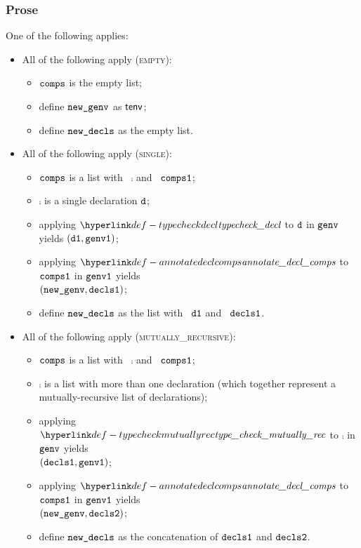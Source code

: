 \subsubsection{Prose}
One of the following applies:
\begin{itemize}
  \item All of the following apply (\textsc{empty}):
  \begin{itemize}
    \item $\texttt{comps}$ is the empty list;
    \item define $\texttt{new\_genv}$ as $\textsf{tenv}$;
    \item define $\texttt{new\_decls}$ as the empty list.
  \end{itemize}

  \item All of the following apply (\textsc{single}):
  \begin{itemize}
    \item $\texttt{comps}$ is a list with \head\ $\comp$ and \tail\ $\texttt{comps1}$;
    \item $\comp$ is a single declaration $\texttt{d}$;
    \item applying $\typecheckdecl$ to $\texttt{d}$ in $\texttt{genv}$ yields $(\texttt{d1}, \texttt{genv1})$\ProseOrTypeError;
    \item applying $\annotatedeclcomps$ to $\texttt{comps1}$ in $\texttt{genv1}$ yields \\ $(\texttt{new\_genv}, \texttt{decls1})$\ProseOrTypeError;
    \item define $\texttt{new\_decls}$ as the list with \head\ $\texttt{d1}$ and \tail\ $\texttt{decls1}$.
  \end{itemize}

  \item All of the following apply (\textsc{mutually\_recursive}):
  \begin{itemize}
    \item $\texttt{comps}$ is a list with \head\ $\comp$ and \tail\ $\texttt{comps1}$;
    \item $\comp$ is a list with more than one declaration (which together represent a mutually-recursive
          list of declarations);
    \item applying $\typecheckmutuallyrec$ to $\comp$ in $\texttt{genv}$ yields \\ $(\texttt{decls1}, \texttt{genv1})$\ProseOrTypeError;
    \item applying $\annotatedeclcomps$ to $\texttt{comps1}$ in $\texttt{genv1}$ yields \\ $(\texttt{new\_genv}, \texttt{decls2})$\ProseOrTypeError;
    \item define $\texttt{new\_decls}$ as the concatenation of $\texttt{decls1}$ and $\texttt{decls2}$.
  \end{itemize}
\end{itemize}

